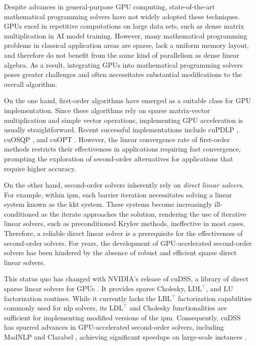 \documentclass{article}
\begin{document}
Despite advances in general-purpose GPU computing, state-of-the-art mathematical programming solvers have not widely adopted these techniques. GPUs excel in repetitive computations on large data sets, such as dense matrix multiplication in AI model training. However, many mathematical programming problems in classical application areas are sparse, lack a uniform memory layout, and therefore do not benefit from the same kind of parallelism as dense linear algebra. As a result, integrating GPUs into mathematical programming solvers poses greater challenges and often necessitates substantial modifications to the overall algorithm.

On the one hand, first-order algorithms have emerged as a suitable class for GPU implementation. Since these algorithms rely on sparse matrix-vector multiplication and simple vector operations, implementing GPU acceleration is usually straightforward. Recent successful implementations include cuPDLP \cite{luCuPDLPCStrengthenedImplementation2024,luCuPDLPFurtherEnhanced2025}, cuOSQP \cite{schubigerGPUAccelerationADMM2020}, and cuOPT \cite{NVIDIACuopt2025}. However, the linear convergence rate of first-order methods restricts their effectiveness in applications requiring fast convergence, prompting the exploration of second-order alternatives for applications that require higher accuracy.

On the other hand, second-order solvers inherently rely on \emph{direct linear solvers}. For example, within \gls*{ipm}, each barrier iteration necessitates solving a linear system known as the \gls*{kkt} system. These systems become increasingly ill-conditioned as the iterate approaches the solution, rendering the use of iterative linear solvers, such as preconditioned Krylov methods, ineffective in most cases. Therefore, a reliable direct linear solver is a prerequisite for the effectiveness of second-order solvers. For years, the development of GPU-accelerated second-order solvers has been hindered by the absence of robust and efficient sparse direct linear solvers.

This status quo has changed with NVIDIA's release of cuDSS, a library of direct sparse linear solvers for GPUs \cite{nvidiaNVIDIACuDSSPreview}. It provides sparse Cholesky, LDL$^\top$, and LU factorization routines. While it currently lacks the LBL$^\top$ factorization capabilities commonly used for \gls*{nlp} solvers, its LDL$^\top$ and Cholesky functionalities are sufficient for implementing modified versions of the \gls*{ipm}. Consequently, cuDSS has spurred advances in GPU-accelerated second-order solvers, including MadNLP \cite{shinAcceleratingOptimalPower2024} and Clarabel \cite{goulartClarabelInteriorpointSolver2024}, achieving significant speedups on large-scale instances \cite{shinNVIDIACuDSSLibrary2024,shinAcceleratingOptimalPower2024,pacaudCondensedspaceMethodsNonlinear2024,shinScalableMultiPeriodAC2024,pacaudGPUacceleratedDynamicNonlinear2024}.
\end{document}
